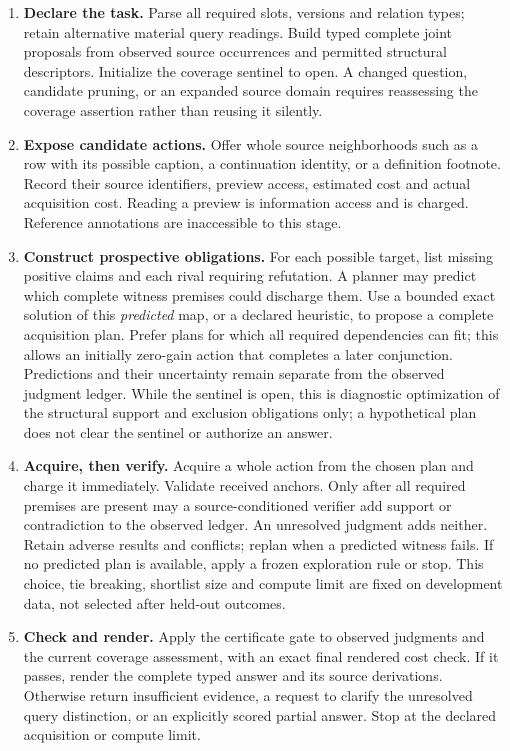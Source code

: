 \documentclass[11pt]{article}
\theoremstyle{definition}
\theoremstyle{remark}
\begin{document}
\begin{enumerate}[label=\arabic*.]
\item \textbf{Declare the task.} Parse all required slots, versions and relation
types; retain alternative material query readings. Build typed complete joint
proposals from observed source occurrences and permitted structural
descriptors. Initialize the coverage sentinel to open. A changed question,
candidate pruning, or an expanded source domain requires reassessing the
coverage assertion rather than reusing it silently.
\item \textbf{Expose candidate actions.} Offer whole source neighborhoods such
as a row with its possible caption, a continuation identity, or a definition
footnote. Record their source identifiers, preview access, estimated cost and
actual acquisition cost. Reading a preview is information access and is
charged. Reference annotations are inaccessible to this stage.
\item \textbf{Construct prospective obligations.} For each possible target,
list missing positive claims and each rival requiring refutation. A planner
may predict which complete witness premises could discharge them. Use a
bounded exact solution of this \emph{predicted} map, or a declared heuristic,
to propose a complete acquisition plan. Prefer plans for which all required
dependencies can fit; this allows an initially zero-gain action that completes
a later conjunction. Predictions and their uncertainty remain separate from
the observed judgment ledger.
While the sentinel is open, this is diagnostic optimization of the structural
support and exclusion obligations only; a hypothetical plan does not clear
the sentinel or authorize an answer.
\item \textbf{Acquire, then verify.} Acquire a whole action from the chosen
plan and charge it immediately. Validate received anchors. Only after all
required premises are present may a source-conditioned verifier add support
or contradiction to the observed ledger. An unresolved judgment adds neither.
Retain adverse results and conflicts; replan when a predicted witness fails.
If no predicted plan is available, apply a frozen exploration rule or stop.
This choice, tie breaking, shortlist size and compute limit are fixed on
development data, not selected after held-out outcomes.
\item \textbf{Check and render.} Apply the certificate gate to observed
judgments and the current coverage assessment, with an exact final rendered
cost check. If it passes, render the complete typed answer and its source
derivations. Otherwise return insufficient evidence, a request to clarify
the unresolved query distinction, or an explicitly scored partial answer.
Stop at the declared acquisition or compute limit.
\end{enumerate}
\end{document}
